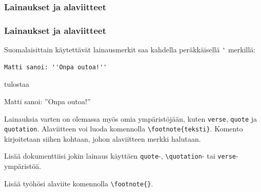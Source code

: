 \subsubsection{Lainaukset ja alaviitteet}
\begin{frame}[fragile]
    \frametitle{Lainaukset ja alaviitteet}
    Suomalaisittain käytettävät lainausmerkit saa kahdella peräkkäisellä \verb-'- merkillä:
    \begin{Verbatim}[frame=single]
Matti sanoi: ''Onpa outoa!''
    \end{Verbatim}
    tulostaa
    \begin{sample}
        Matti sanoi: ''Onpa outoa!''
    \end{sample}
    Lainauksia varten on olemassa myös omia ympäristöjään, kuten \verb-verse-, \verb-quote- ja \verb-quotation-.
    \vaihto
    Alaviitteen voi luoda komennolla \verb-\footnote{teksti}-. Komento kirjoitetaan siihen kohtaan, johon alaviitteen merkki halutaan. 
\end{frame}
\begin{frame}[fragile]
    \begin{harj}
        Lisää dokumenttiisi jokin lainaus käyttäen \verb-quote--, \verb-\quotation-- tai \verb-verse--ympäristöä. 
    \end{harj}
    \begin{harj}
        Lisää työhösi alaviite komennolla \verb-\footnote{}-. 
    \end{harj}
\end{frame}
